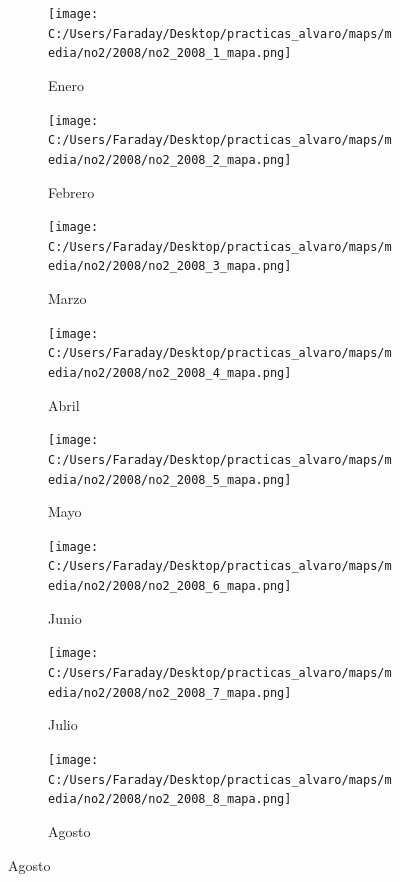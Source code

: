 \documentclass[12pt]{beamer}
\begin{document}
\begin{frame}[squeeze]
\tiny
\begin{figure}[H]
\centering
\begin{subfigure}[H]{0.20\textwidth}
\texttt{[image: C:/Users/Faraday/Desktop/practicas\_alvaro/maps/media/no2/2008/no2\_2008\_1\_mapa.png]}
\captionsetup{labelformat=empty}
\caption{\scriptsize Enero}
\label{fig:map-no2-2008-1}
\end{subfigure}
%
\begin{subfigure}[H]{0.20\textwidth}
\texttt{[image: C:/Users/Faraday/Desktop/practicas\_alvaro/maps/media/no2/2008/no2\_2008\_2\_mapa.png]}
\captionsetup{labelformat=empty}
\caption{\scriptsize Febrero}
\label{fig:map-no2-2008-2}
\end{subfigure}
%
\begin{subfigure}[H]{0.20\textwidth}
\texttt{[image: C:/Users/Faraday/Desktop/practicas\_alvaro/maps/media/no2/2008/no2\_2008\_3\_mapa.png]}
\captionsetup{labelformat=empty}
\caption{\scriptsize Marzo}
\label{fig:map-no2-2008-3}
\end{subfigure}
%
\begin{subfigure}[H]{0.20\textwidth}
\texttt{[image: C:/Users/Faraday/Desktop/practicas\_alvaro/maps/media/no2/2008/no2\_2008\_4\_mapa.png]}
\captionsetup{labelformat=empty}
\caption{\scriptsize Abril}
\label{fig:map-no2-2008-4}
\end{subfigure}

\begin{subfigure}[H]{0.20\textwidth}
\texttt{[image: C:/Users/Faraday/Desktop/practicas\_alvaro/maps/media/no2/2008/no2\_2008\_5\_mapa.png]}
\captionsetup{labelformat=empty}
\caption{\scriptsize Mayo}
\label{fig:map-no2-2008-5}
\end{subfigure}
%
\begin{subfigure}[H]{0.20\textwidth}
\texttt{[image: C:/Users/Faraday/Desktop/practicas\_alvaro/maps/media/no2/2008/no2\_2008\_6\_mapa.png]}
\captionsetup{labelformat=empty}
\caption{\scriptsize Junio}
\label{fig:map-no2-2008-6}
\end{subfigure}
%
\begin{subfigure}[H]{0.20\textwidth}
\texttt{[image: C:/Users/Faraday/Desktop/practicas\_alvaro/maps/media/no2/2008/no2\_2008\_7\_mapa.png]}
\captionsetup{labelformat=empty}
\caption{\scriptsize Julio}
\label{fig:map-no2-2008-7}
\end{subfigure}
%
\begin{subfigure}[H]{0.20\textwidth}
\texttt{[image: C:/Users/Faraday/Desktop/practicas\_alvaro/maps/media/no2/2008/no2\_2008\_8\_mapa.png]}
\captionsetup{labelformat=empty}
\caption{\scriptsize Agosto}
\label{fig:map-no2-2008-8}
\end{subfigure}


\end{figure}
\end{frame}
\end{document}
